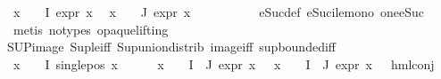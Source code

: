 \begin{isabellebody}
\ {\isachardoublequoteopen}{\isasymforall}x\ {\isasymin}\ {\isacharparenleft}{\kern0pt}{\isasymPhi}\ {\isacharbackquote}{\kern0pt}\ I{\isacharparenright}{\kern0pt}{\isachardot}{\kern0pt}\ expr{\isacharunderscore}{\kern0pt}{}\ x\ {\isasymle}\ {}{\isachardoublequoteclose}\isanewline
{\isachardoublequoteopen}{\isasymforall}x\ {\isasymin}\ {\isacharparenleft}{\kern0pt}{\isasymPhi}\ {\isacharbackquote}{\kern0pt}\ J{\isacharparenright}{\kern0pt}{\isachardot}{\kern0pt}\ expr{\isacharunderscore}{\kern0pt}{}\ x\ {\isasymle}\ {}{\isachardoublequoteclose}\isanewline
\ \ \ \ \isamarkupfalse%
\ {}\ \isamarkupfalse%
\ eSuc{\isacharunderscore}{\kern0pt}def\ eSuc{\isacharunderscore}{\kern0pt}ile{\isacharunderscore}{\kern0pt}mono\ one{\isacharunderscore}{\kern0pt}eSuc\isanewline
\ \ \ \ \isamarkupfalse%
\ {\isacharparenleft}{\kern0pt}metis\ {\isacharparenleft}{\kern0pt}no{\isacharunderscore}{\kern0pt}types{\isacharcomma}{\kern0pt}\ opaque{\isacharunderscore}{\kern0pt}lifting{\isacharparenright}{\kern0pt}\ \isanewline
SUP{\isacharunderscore}{\kern0pt}image\ Sup{\isacharunderscore}{\kern0pt}le{\isacharunderscore}{\kern0pt}iff\ Sup{\isacharunderscore}{\kern0pt}union{\isacharunderscore}{\kern0pt}distrib\ image{\isacharunderscore}{\kern0pt}iff\ sup{\isachardot}{\kern0pt}bounded{\isacharunderscore}{\kern0pt}iff{\isacharparenright}{\kern0pt}{\isacharplus}{\kern0pt}\isanewline
\ \ \isamarkupfalse%
\ {\isachardoublequoteopen}{\isasymforall}x\ {\isasymin}\ {\isacharparenleft}{\kern0pt}{\isasymPhi}\ {\isacharbackquote}{\kern0pt}\ I{\isacharparenright}{\kern0pt}{\isachardot}{\kern0pt}\ single{\isacharunderscore}{\kern0pt}pos\ x{\isachardoublequoteclose}\isanewline
\ \ \ \ \isamarkupfalse%
\ {\isacartoucheopen}{\isasymforall}x\ {\isasymin}\ {\isacharparenleft}{\kern0pt}{\isasymPhi}\ {\isacharbackquote}{\kern0pt}\ {\isacharparenleft}{\kern0pt}I\ {\isasymunion}\ J{\isacharparenright}{\kern0pt}{\isacharparenright}{\kern0pt}{\isachardot}{\kern0pt}\ expr{\isacharunderscore}{\kern0pt}{}\ x\ {\isasymle}\ {}{\isacartoucheclose}\ {\isacartoucheopen}{\isasymforall}x\ {\isasymin}\ {\isacharparenleft}{\kern0pt}{\isasymPhi}\ {\isacharbackquote}{\kern0pt}\ {\isacharparenleft}{\kern0pt}I\ {\isasymunion}\ J{\isacharparenright}{\kern0pt}{\isacharparenright}{\kern0pt}{\isachardot}{\kern0pt}\ expr{\isacharunderscore}{\kern0pt}{}\ x\ {\isasymle}\ {}{\isacartoucheclose}\ hml{\isacharunderscore}{\kern0pt}conj{\isacharparenleft}{\kern0pt}{}{\isacharparenright}{\kern0pt}\isanewline

\end{isabellebody}
